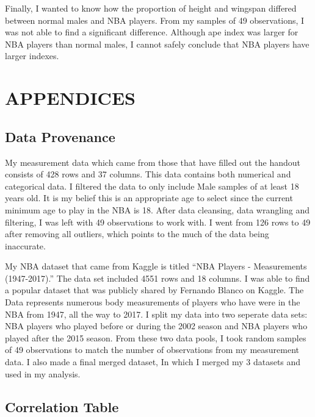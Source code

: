 \documentclass[]{article}
\begin{document}
Finally, I wanted to know how the proportion of height and wingspan
differed between normal males and NBA players. From my samples of 49
observations, I was not able to find a significant difference. Although
ape index was larger for NBA players than normal males, I cannot safely
conclude that NBA players have larger indexes.

\newpage
\section{APPENDICES}
\label{sec:appendix}

\subsection{Data Provenance}
\label{sec:appendix-data-provenance}

My measurement data which came from those that have filled out the
handout consists of 428 rows and 37 columns. This data contains both
numerical and categorical data. I filtered the data to only include Male
samples of at least 18 years old. It is my belief this is an appropriate
age to select since the current minimum age to play in the NBA is 18.
After data cleansing, data wrangling and filtering, I was left with 49
observations to work with. I went from 126 rows to 49 after removing all
outliers, which points to the much of the data being inaccurate.
\newline \newline

My NBA dataset that came from Kaggle is titled ``NBA Players -
Measurements (1947-2017).'' The data set included 4551 rows and 18
columns. I was able to find a popular dataset that was publicly shared
by Fernando Blanco on Kaggle. The Data represents numerous body
measurements of players who have were in the NBA from 1947, all the way
to 2017. I split my data into two seperate data sets: NBA players who
played before or during the 2002 season and NBA players who played after
the 2015 season. From these two data pools, I took random samples of 49
observations to match the number of observations from my measurement
data. I also made a final merged dataset, In which I merged my 3
datasets and used in my analysis. \newline \newline

\subsection{Correlation Table}
\label{sec:Summary Statistics of Data}
\end{document}
